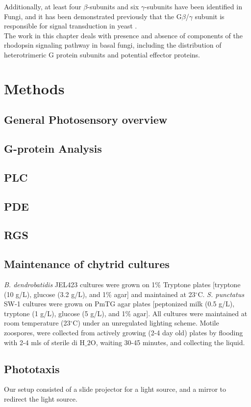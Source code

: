 \indent Additionally, at least four $\beta$-subunits and six $\gamma$-subunits have been identified \cite{Hepler1992} in Fungi, and it has been demonstrated previously that the G$\beta$/$\gamma$ subunit is responsible for signal transduction in yeast \cite{Bolker1998}.\\
\indent The work in this chapter deals with presence and absence of components of the rhodopsin signaling pathway in basal fungi, including the distribution of heterotrimeric G protein subunits and potential effector proteins.\\
\section{Methods}
\subsection{General Photosensory overview}
\subsection{G-protein Analysis}
\subsection{PLC}
\subsection{PDE}
\subsection{RGS}
\subsection{Maintenance of chytrid cultures}
\textit{B. dendrobatidis} JEL423 cultures were grown on 1\% Tryptone plates [tryptone (10 g/L), glucose (3.2 g/L), and 1\% agar] and maintained at 23$^{\circ}$C. \textit{S. punctatus} SW-1 cultures were grown on PmTG agar plates [peptonized milk (0.5 g/L), tryptone (1 g/L), glucose (5 g/L), and 1\% agar]. All cultures were maintained at room temperature (23$^{\circ}$C) under an unregulated lighting scheme. Motile zoospores, were collected from actively growing (2-4 day old) plates by flooding with 2-4 mls of sterile di H$\_{2}$O, waiting 30-45 minutes, and collecting the liquid. \\
\subsection{Phototaxis}
Our setup consisted of a slide projector for a light source, and a mirror to redirect the light source.\\
